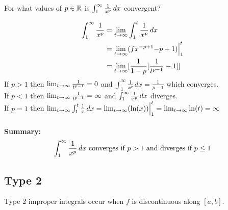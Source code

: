 \documentclass[english, 12pt]{article}
\begin{document}
\begin{exmp}
For what values of $p \in {\mathbb{R}}$ is $\int_1^\infty \frac{1}{x^p}\,dx$ convergent?
\begin{sol}
\begin{align*}
\int_1^\infty \frac{1}{x^p} & = \lim_{t \to \infty} \int_1^t \frac{1}{x^p}\,dx\\
& = \lim_{t \to \infty} (f{x^{-p+1}}{-p+1})\Big|_1^t \\
& = \lim_{t \to \infty} [\frac{1}{1-p} [\frac{1}{t^{p-1}} - 1]]
\end{align*}
If $p > 1$ then $\lim_{t \to \infty} \frac{1}{t^{p-1}} = 0$ and $\int_1^\infty \frac{1}{x^p}\,dx = \frac{1}{p-1}$ which converges.\\
If $p < 1$ then $\lim_{t \to \infty} \frac{1}{t^{p-1}} = \infty$ and $\int_1^\infty \frac{1}{x^p}\,dx$ diverges.\\
If $p = 1$ then $\lim_{t \to \infty} \int_1^t \frac{1}{x}\,dx = \lim_{t \to \infty} (\ln(x))\Big|_1^t = \lim_{t \to \infty} \ln(t) = \infty $\\\\
\textbf{Summary:}
\[\int_1^\infty \frac{1}{x^p}\,dx \text{ converges if } p > 1 \text{ and diverges if } p \leq 1 \]
\end{sol}
\end{exmp}
\subsection*{Type 2}
Type 2 improper integrals occur when $f$ is discontinuous along $[a,b]$. 
\end{document}
